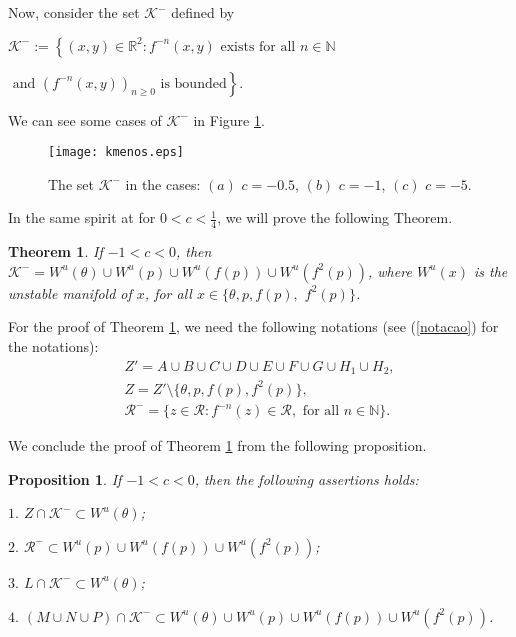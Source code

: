 \documentclass[11pt]{amsart}
\newtheorem{theorem}{Theorem}[section]
\newtheorem{proposition}{Proposition}
\theoremstyle{definition}
\begin{document}
Now, consider the set $\mathcal{K}^-$ defined by

\smallskip 

\noindent $\mathcal{K}^-:=\left\{(x,y)\in\mathbb{R}^2:f^{-n}(x,y) \textrm{ exists for all } n\in\mathbb{N}\right.$

\hfill $\left. \textrm{ and } (f^{-n}(x,y))_{n\geq 0} \textrm{ is bounded}\right\}$.

\smallskip 

We can see some cases of $\mathcal{K}^-$ in Figure \ref{kmenos}.

\begin{figure}[!h]
	\centering
	\texttt{[image: kmenos.eps]}
	\caption{The set $\mathcal{K}^-$ in the cases: $(a)$ $c=-0.5$, $(b)$ $c=-1$, $(c)$ $c=-5$.} \label{kmenos}
\end{figure}

In the same spirit at \cite{bcm} for $0<c<\frac{1}{4}$, we will prove the following Theorem.
	
\begin{theorem} \label{lemaaaziavolta}
	If $-1< c<0$, then $\mathcal{K}^-=W^u(\theta)\cup W^u(p)\cup
	W^u(f(p))\cup W^u(f^2(p))$, where $W^u(x)$ is the unstable manifold of $x$, for all $x\in\{\theta,p,f(p),$ $f^2(p)\}$.
\end{theorem}

For the proof of Theorem \ref{lemaaaziavolta}, we need the following notations (see (\ref{notacao}) for the notations):
\begin{equation} \label{notacaomenos}
\begin{array}{l}
Z'=A\cup B\cup C\cup D\cup E\cup F\cup G\cup H_1\cup H_2, \\
Z=Z'\setminus\{\theta,p,f(p),f^2(p)\}, \\
\mathcal{R}^-=\{z\in \mathcal{R}: f^{-n}(z)\in\mathcal{R}, \textrm{ for all } n\in\mathbb{N}\}.
\end{array}
\end{equation}

We conclude the proof of Theorem \ref{lemaaaziavolta} from the following proposition.

\begin{proposition} \label{propkmenos} 
If $-1<c<0$, then the following assertions holds:

\noindent $1.$ $Z\cap \mathcal{K}^{-}\subset W^u(\theta)$;

\noindent $2.$ $\mathcal{R}^-\subset W^u(p)\cup W^u(f(p))\cup W^u(f^2(p))$;

\noindent $3.$ $L\cap \mathcal{K}^-\subset W^u(\theta)$;

\noindent $4.$ $(M\cup N\cup P)\cap \mathcal{K}^-\subset W^u(\theta)\cup W^u(p)\cup W^u(f(p))\cup W^u(f^2(p))$.
\end{proposition}
\end{document}
